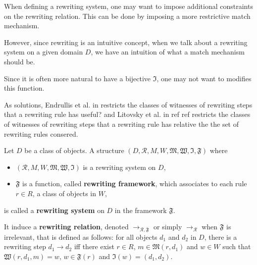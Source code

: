 When defining a rewriting system, one may want to impose additional constraints on the rewriting relation. This can be done by imposing a more restrictive match mechanism. 

However, since rewriting is an intuitive concept, when we talk about a rewriting system on a given domain $D$, we have an intuition of what a match mechanism should be. 

Since it is often more natural to have a bijective $\mathfrak{I}$, one may not want to modifies this function.

As solutions, Endrullis et al. in \cite{endrullis2024generalized}  restricts the classes of witnesses of rewriting steps that a rewriting rule has
useful?  and Litovsky et al. in  ref ref restricts the classes of witnesses of rewriting steps that a rewriting rule has relative the the set of rewriting rules consered.

\begin{definition}
  \label{def:rewriting_system_with_framework}
  Let $D$ be a class of objects. 
  A structure $(D, \mathcal{R},M,W,\mathfrak{M},\mathfrak{W},\mathfrak{I},\mathfrak{F})$ where 
  \begin{itemize}
    \item $(\mathcal{R},M,W,\mathfrak{M},\mathfrak{W},\mathfrak{I})$ is a rewriting system on $D$,
    \item $\mathfrak{F}$ is a function, called \textbf{rewriting framework},  which associates to each rule $r \in R$, 
       a class of objects in $W$,
  \end{itemize}
   is called a \textbf{rewriting system} on $D$ in the framework $\mathfrak{F}$.
   
   It induce a \textbf{rewriting relation}, denoted $\rightarrow_{\mathcal{R},\mathfrak{F}}$ or simply $\to_{\mathcal{R}}$ when $\mathfrak{F}$ is irrelevant, that is defined as follows: for all objects $d_1$ and $d_2$ in $D$, there is a rewriting step $d_1 \rightarrow d_2$ iff there exist $r \in R$, $m \in \mathfrak{M}(r,d_1)$ and $w \in W$ such that $\mathfrak{W}(r,d_1,m) = w$, $w \in \mathfrak{F}(r)$ and $\mathfrak{I}(w) = (d_1,d_2)$.
\end{definition}

